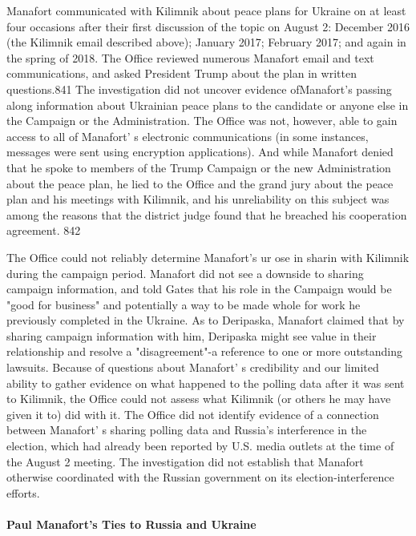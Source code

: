 Manafort communicated with Kilimnik about peace plans for Ukraine on at least four occasions after their first discussion of the topic on August 2: December 2016 (the Kilimnik email described above); January 2017; February 2017; and again in the spring of 2018. The Office reviewed numerous Manafort email and text communications, and asked President Trump about the plan in written questions.841 The investigation did not uncover evidence ofManafort's passing along information about Ukrainian peace plans to the candidate or anyone else in the Campaign or the Administration. The Office was not,  however, able to gain access to all of Manafort' s electronic communications (in some instances, messages were sent using encryption applications). And while Manafort denied that he spoke to members of the Trump Campaign or the new Administration about the peace plan, he lied to the Office and the grand jury about the peace plan and his meetings with Kilimnik, and his unreliability on this subject was among the reasons that the district judge found that he breached his cooperation agreement. 842

The Office could not reliably determine Manafort's ur ose in sharin with Kilimnik during the campaign period. Manafort did not see a downside to sharing campaign information, and told Gates that his role in the Campaign would be "good for business" and potentially a way to be made whole for work he previously completed in the Ukraine. As to Deripaska, Manafort claimed that by sharing campaign information with him, Deripaska might see value in their relationship and resolve a "disagreement"-a reference to one or more outstanding lawsuits. Because of questions about Manafort' s  credibility and our limited ability to gather evidence on what happened to the polling data after it was sent to Kilimnik, the Office could not assess what Kilimnik (or others he may have given it  to) did with it. The Office did not identify evidence of a  connection between Manafort' s  sharing polling data and Russia's interference in the election, which had already been reported by U.S. media outlets at the time of the August 2 meeting. The investigation did not establish that Manafort otherwise coordinated with the Russian government on its election-interference efforts.

\paragraph{Paul Manafort's Ties to Russia and Ukraine}


